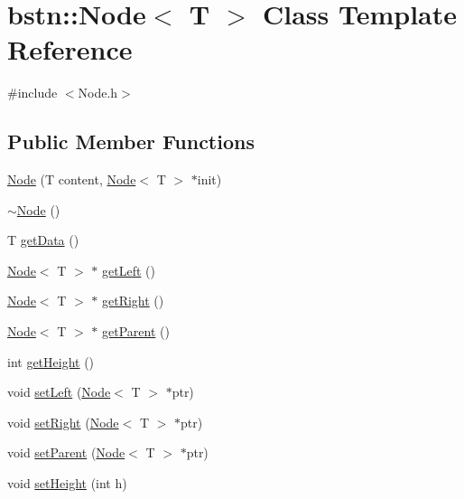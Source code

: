 \hypertarget{classbstn_1_1_node}{}\section{bstn\+:\+:Node$<$ T $>$ Class Template Reference}
\label{classbstn_1_1_node}


{\ttfamily \#include $<$Node.\+h$>$}

\subsection*{Public Member Functions}
\begin{DoxyCompactItemize}
\item 
\hyperlink{classbstn_1_1_node_adeb64e408fddcc22673bc3003ed76c20}{Node} (T content, \hyperlink{classbstn_1_1_node}{Node}$<$ T $>$ $\ast$init)
\item 
\hyperlink{classbstn_1_1_node_a6d0dfee40c3dbd9a02075b6ee31881f6}{$\sim$\+Node} ()
\item 
T \hyperlink{classbstn_1_1_node_adaa781c14285d9b5041681968f3713e6}{get\+Data} ()
\item 
\hyperlink{classbstn_1_1_node}{Node}$<$ T $>$ $\ast$ \hyperlink{classbstn_1_1_node_a1cc2499449d93de58806e10f993e9817}{get\+Left} ()
\item 
\hyperlink{classbstn_1_1_node}{Node}$<$ T $>$ $\ast$ \hyperlink{classbstn_1_1_node_a2881386e10ebb97605161caeab0627b2}{get\+Right} ()
\item 
\hyperlink{classbstn_1_1_node}{Node}$<$ T $>$ $\ast$ \hyperlink{classbstn_1_1_node_a16ca7318c5f34829382fe08df22c1523}{get\+Parent} ()
\item 
int \hyperlink{classbstn_1_1_node_a43c2f0506943d02f0d8c18d80da6eeb9}{get\+Height} ()
\item 
void \hyperlink{classbstn_1_1_node_af2b576b9f2a832e49f500ab2ffa76bf7}{set\+Left} (\hyperlink{classbstn_1_1_node}{Node}$<$ T $>$ $\ast$ptr)
\item 
void \hyperlink{classbstn_1_1_node_a48a0197bfa0a26f2f065029b44a67ba4}{set\+Right} (\hyperlink{classbstn_1_1_node}{Node}$<$ T $>$ $\ast$ptr)
\item 
void \hyperlink{classbstn_1_1_node_a98426cc7a841611784d46ed76b635f9d}{set\+Parent} (\hyperlink{classbstn_1_1_node}{Node}$<$ T $>$ $\ast$ptr)
\item 
void \hyperlink{classbstn_1_1_node_ae7ee139e2ceb5fb88dcf621dd747166b}{set\+Height} (int h)
\end{DoxyCompactItemize}


